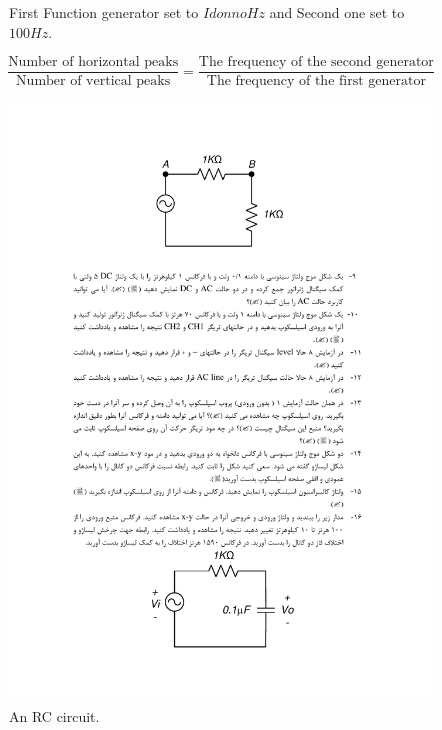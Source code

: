 \documentclass[11pt]{article}
\begin{document}
\begin{question}
{\begin{figure}[H]
\begin{center}
                \caption{First Function generator set to $I donno Hz$ and Second one set to $100Hz$.}
            \end{center}
        \end{figure}

        \[
            \frac{\text{Number of horizontal peaks}}{\text{Number of vertical peaks}} = \frac{\text{The frequency of the second generator}}{\text{The frequency of the first generator}}
        \]
    }

\end{question}


\begin{question}

    \begin{figure}[H]
        \centering
        \includegraphics[scale=0.8,angle=0]{Fig/cir2.pdf}
        \caption{An RC circuit.} \label{fig:cir2}
    \end{figure}


\end{question}
\end{document}
